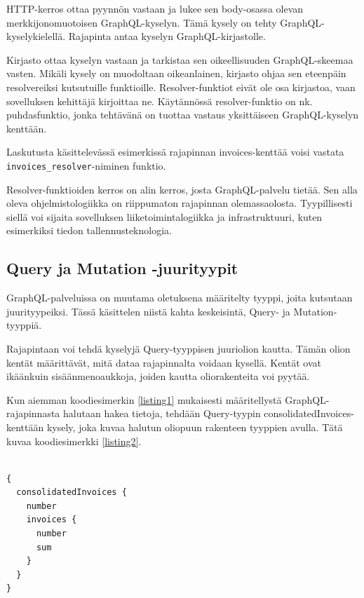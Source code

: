 HTTP-kerros ottaa pyynnön vastaan ja lukee sen body-osassa olevan
merkkijonomuotoisen GraphQL-kyselyn. Tämä kysely on tehty
GraphQL-kyselykielellä. Rajapinta antaa kyselyn GraphQL-kirjastolle.

Kirjasto ottaa kyselyn vastaan ja tarkistaa sen oikeellisuuden
GraphQL-skeemaa vasten. Mikäli kysely on muodoltaan oikeanlainen,
kirjasto ohjaa sen eteenpäin resolvereiksi kutsutuille funktioille.
Resolver-funktiot eivät ole osa kirjastoa, vaan sovelluksen kehittäjä
kirjoittaa ne. Käytännössä resolver-funktio on nk. \gls{puhdasfunktio},
jonka tehtävänä on tuottaa vastaus yksittäiseen GraphQL-kyselyn
kenttään.

Laskutusta käsittelevässä esimerkissä rajapinnan invoices-kenttää voisi
vastata \texttt{invoices\_resolver}-niminen funktio.

Resolver-funktioiden kerros on alin kerros, josta GraphQL-palvelu
tietää. Sen alla oleva ohjelmistologiikka on riippumaton rajapinnan
olemassaolosta. Tyypillisesti siellä voi sijaita sovelluksen
liiketoimintalogiikka ja infrastruktuuri, kuten esimerkiksi tiedon
tallennusteknologia.

\hypertarget{query-ja-mutation--juurityypit}{%
\subsection{Query ja Mutation
-juurityypit}\label{query-ja-mutation--juurityypit}}

GraphQL-palveluissa on muutama oletuksena määritelty tyyppi, joita
kutsutaan juurityypeiksi. Tässä käsittelen niistä kahta keskeisintä,
Query- ja Mutation-tyyppiä.

Rajapintaan voi tehdä kyselyjä Query-tyyppisen juuriolion kautta. Tämän
olion kentät määrittävät, mitä dataa rajapinnalta voidaan kysellä.
Kentät ovat ikäänkuin sisäänmenoaukkoja, joiden kautta oliorakenteita
voi pyytää.

Kun aiemman koodiesimerkin \ref{listing1} mukaisesti määritellystä
GraphQL-rajapinnasta halutaan hakea tietoja, tehdään Query-tyypin
consolidatedInvoices-kenttään kysely, joka kuvaa halutun oliopuun
rakenteen tyyppien avulla. Tätä kuvaa koodiesimerkki \ref{listing2}.

\begin{code}
  \begin{verbatim}

{
  consolidatedInvoices {
    number
    invoices {
      number
      sum
    }
  }
}
\end{verbatim}
  \label{listing2}
\end{code}

